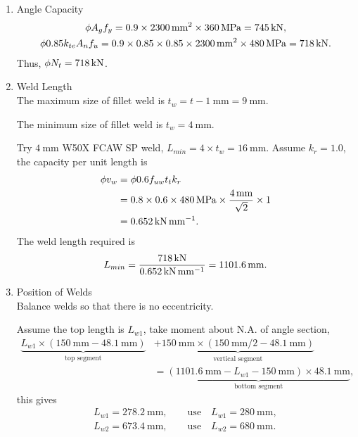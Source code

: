 \begin{solution}
\begin{enumerate}
\item Angle Capacity
\begin{gather*}
\phi{}A_gf_y=0.9\times\SI{2300}{\milli\meter^2}\times\SI{360}{\mega\pascal}=\SI{745}{\kilo\newton},\\
\phi0.85k_{te}A_nf_u=0.9\times0.85\times0.85\times\SI{2300}{\milli\meter^2}\times\SI{480}{\mega\pascal}=\SI{718}{\kilo\newton}.
\end{gather*}
Thus, $\phi{}N_t=\SI{718}{\kilo\newton}$.
\item Weld Length\\
The maximum size of fillet weld is $t_w=t-\SI{1}{\mm}=\SI{9}{\mm}$.

The minimum size of fillet weld is $t_w=\SI{4}{\mm}$.

Try $\SI{4}{\mm}$ W50X FCAW SP weld, $L_{min}=4\times{}t_w=\SI{16}{\mm}$. Assume $k_r=1.0$, the capacity per unit length is
\begin{align*}
\phi{}v_w&=\phi{}0.6f_{uw}t_tk_r\\
&=0.8\times0.6\times\SI{480}{\mega\pascal}\times\dfrac{\SI{4}{\milli\meter}}{\sqrt{2}}\times1\\
&=\SI{0.652}{\kilo\newton\per\milli\meter}.
\end{align*}
The weld length required is
\begin{gather*}
L_{min}=\dfrac{\SI{718}{\kilo\newton}}{\SI{0.652}{\kilo\newton\per\milli\meter}}=\SI{1101.6}{\milli\meter}.
\end{gather*}
\item Position of Welds\\
Balance welds so that there is no eccentricity.
\begin{figure}[H]
\centering

\end{figure}
Assume the top length is $L_{w1}$, take moment about N.A. of angle section,
\begin{align*}
\underbrace{L_{w1}\times\left(\SI{150}{\mm}-\SI{48.1}{\mm}\right)}_\text{top segment}&+\underbrace{\SI{150}{\mm}\times\left(\SI{150}{\mm}/2-\SI{48.1}{\mm}\right)}_\text{vertical segment}\\&=\underbrace{\left(\SI{1101.6}{\mm}-L_{w1}-\SI{150}{\mm}\right)\times\SI{48.1}{\mm}}_\text{bottom segment},
\end{align*}
this gives
\begin{gather*}
L_{w1}=\SI{278.2}{\mm},\qquad\text{use}\quad{}L_{w1}=\SI{280}{\mm},\\
L_{w2}=\SI{673.4}{\mm},\qquad\text{use}\quad{}L_{w2}=\SI{680}{\mm}.
\end{gather*}


\end{enumerate}
\end{solution}
